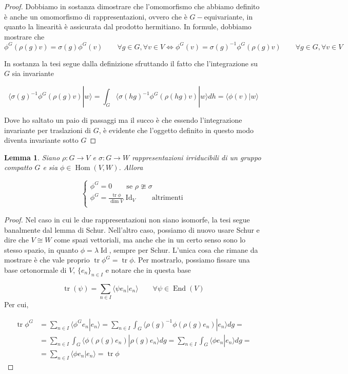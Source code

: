 \documentclass[11pt]{article}
\theoremstyle{plain}
\newtheorem{lemma}[thm]{Lemma}
\theoremstyle{definition}
\theoremstyle{remark}
\newcommand{\dsum}{\displaystyle\sum}
\newcommand{\dint}{\displaystyle\int}
\DeclareMathOperator{\tr}{tr}
\DeclareMathOperator{\Hom}{Hom}
\DeclareMathOperator{\End}{End}
\DeclareMathOperator{\Id}{Id}
\begin{document}
 \begin{proof}
   Dobbiamo in sostanza dimostrare che l'omomorfismo che abbiamo definito è anche un omomorfismo di rappresentazioni, ovvero che è $G-$equivariante, in quanto la linearità è assicurata dal prodotto hermitiano. In formule, dobbiamo mostrare che
   \[ \phi^G (\rho(g) v) = \sigma(g) \phi^G(v) \qquad \forall g \in G, \forall v \in V \Leftrightarrow \phi^G(v) = \sigma(g) ^{-1} \phi^G(\rho(g) v) \qquad \forall g \in G, \forall v \in V \]

   In sostanza la tesi segue dalla definizione sfruttando il fatto che l'integrazione su $G$ sia invariante


   \[ \langle \sigma(g) ^{-1} \phi^G(\rho(g) v) | w \rangle  = \dint_G \langle \sigma(hg) ^{-1} \phi^G(\rho(hg) v) | w \rangle dh = \langle \phi(v) | w \rangle\]

   Dove ho saltato un paio di passaggi ma il succo è che essendo l'integrazione invariante per traslazioni di $G$, è evidente che l'oggetto definito in questo modo diventa invariante sotto $G$
 \end{proof}

 \begin{lemma}
   Siano $\rho: G \to V$ e $\sigma: G \to W$ rappresentazioni irriducibili di un gruppo compatto $G$ e sia $\phi \in \Hom(V, W)$. Allora

   \[
   \begin{cases}
     \phi^G = 0 \qquad \text{se } \rho \ncong \sigma \\
     \phi^G = \frac{\tr \phi}{\dim V}\Id_V \qquad \text{altrimenti} \\
   \end{cases}
   \]

 \end{lemma}

 \begin{proof}
   Nel caso in cui le due rappresentazioni non siano isomorfe, la tesi segue banalmente dal lemma di Schur. Nell'altro caso, possiamo di nuovo usare Schur e dire che $V \cong W$ come spazi vettoriali, ma anche che in un certo senso sono lo stesso spazio, in quanto $\phi = \lambda \Id$, sempre per Schur. L'unica cosa che rimane da mostrare è che vale proprio $\tr \phi^G = \tr \phi$. Per mostrarlo, possiamo fissare una base ortonormale di $V$, $\{ e_n\}_{n\in I}$ e notare che in questa base

   \[ \tr(\psi) = \dsum_{n \in I}\langle \psi e_n | e_n \rangle \qquad \forall \psi \in \End(V)\]
   Per cui,

   \begin{align*} \tr \phi^G &= \dsum_{n \in I}\langle \phi^G e_n | e_n \rangle = \dsum_{n \in I} \dint_G \langle \rho(g)^{-1} \phi(\rho(g) e_n) | e_n \rangle dg = \\
     &= \dsum_{n \in I}\dint_G \langle \phi(\rho(g) e_n) | \rho(g) e_n \rangle  dg = \dsum_{n \in I} \dint_G \langle \phi e_n |  e_n \rangle dg = \\
     &= \dsum_{n\in I} \langle \phi e_n | e_n \rangle = \tr \phi
   \end{align*}

   
 \end{proof}
\end{document}
